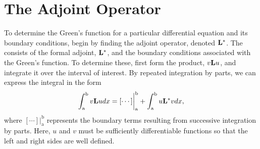 \section{The Adjoint Operator}
To determine the Green's function for a particular differential equation and its boundary conditions, begin by finding the adjoint operator, denoted \(\mathcal{\mathrm{\bf{L^*}}  }\). The  consists of the formal adjoint, \(\mathrm{\bf{L^*}}  \), and the boundary conditions associated with the Green's function. To determine these, first form the product, \(v\mathrm{\bf{L}} u\), and integrate it over the interval of interest. By repeated integration by parts, we can express the integral in the form
\begin{equation} \label{eq:adjoint}
	\int_\mathrm{a}^\mathrm{b} v \mathrm{\bf{L}} u dx = [\cdots]\biggr\rvert_\mathrm{a}^\mathrm{b} + \int_\mathrm{a}^\mathrm{b} u\mathrm{\bf{L^*}}  v dx,
\end{equation}
where \([\cdots]\biggr\rvert_\mathrm{a}^\mathrm{b}\) represents the boundary terms resulting from successive integration by parts. Here, \(u\) and \(v\) must be sufficiently differentiable functions so that the left and right sides are well defined. 

